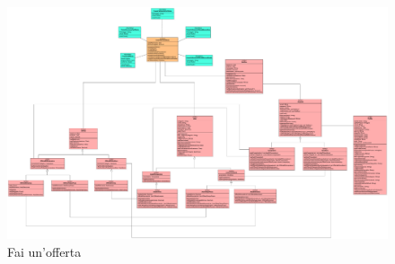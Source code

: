             \begin{figure}[htbp!]
                \centering
                    \includegraphics[width=1\linewidth]{Immagini/Diagrammi/Class Diagram/Analisi/Venditore e compratore/FaiOfferta.pdf}
                \caption{Fai un'offerta}
            \end{figure}

    \clearpage
        
